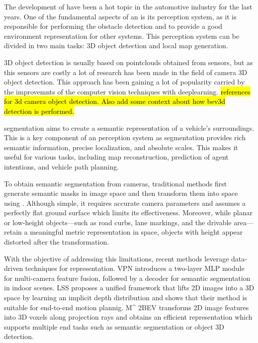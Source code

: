 
The development of  have been a hot topic in the automotive industry for the last years. One of the fundamental aspects of an  is its perception system, as it is responsible for performing the obstacle detection and to provide a good environment representation for other systems. This perception system can be divided in two main tasks: 3D object detection and local  map generation. 

3D object detection is usually based on pointclouds obtained from  sensors, but as this sensors are costly a lot of research has been made in the field of camera 3D object detection. This approach has been gaining a lot of popularity carried by the improvemnts of the computer vision techniques with deeplearning. \hl{references for 3d camera object detection. Also add some context about how bev3d detection is performed.}

 segmentation aims to create a semantic representation of a vehicle's surroundings. This is a key component of an  perception system as  segmentation provides rich semantic information, precise localization, and absolute scales. This makes it useful for various tasks, including map reconstruction, prediction of agent intentions, and vehicle path planning.

To obtain  semantic segmentation from cameras, traditional methods first generate semantic masks in image space and then transform them into  space using . Although simple, it requires accurate camera parameters and assumes a perfectly flat ground surface which limits its effectiveness. Moreover, while planar or low-height objects—such as road curbs, lane markings, and the drivable area—retain a meaningful metric representation in  space, objects with height appear distorted after the transformation.

With the objective of addressing this limitations, recent methods leverage data-driven techniques for  representation. VPN \cite{view_parsing_network} introduces a two-layer MLP module for multi-camera feature fusion, followed by a decoder for semantic segmentation in indoor scenes. LSS \cite{lift_splat_shoot} proposes a unified framework that lifts 2D images into a 3D space by learning an implicit depth distribution and shows that their method is suitable for end-to-end motion plannig. M\^{} 2BEV \cite{m2bev} transforms 2D image features into 3D voxels along projection rays and obtains an efficient  representation which supports multiple end tasks such as semantic segmentation or object 3D detection.


